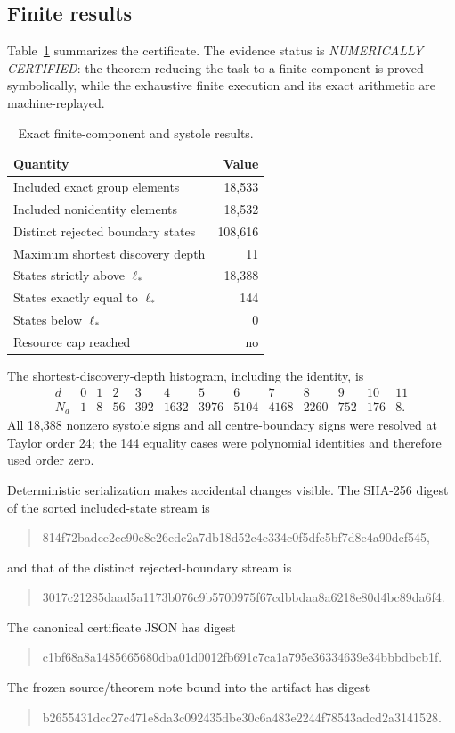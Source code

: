 \documentclass[11pt,a4paper]{article}
\theoremstyle{definition}
\newcommand{\length}{\ell}
\begin{document}
\subsection{Finite results}

Table~\ref{tab:results} summarizes the certificate.  The evidence status is
\emph{NUMERICALLY CERTIFIED}: the theorem reducing the task to a finite
component is proved symbolically, while the exhaustive finite execution and
its exact arithmetic are machine-replayed.

\begin{table}[htbp]
\centering
\caption{Exact finite-component and systole results.}
\label{tab:results}
\begin{tabular}{@{}lr@{}}
\toprule
Quantity & Value\\
\midrule
Included exact group elements & 18,533\\
Included nonidentity elements & 18,532\\
Distinct rejected boundary states & 108,616\\
Maximum shortest discovery depth & 11\\
States strictly above \(\length_*\) & 18,388\\
States exactly equal to \(\length_*\) & 144\\
States below \(\length_*\) & 0\\
Resource cap reached & no\\
\bottomrule
\end{tabular}
\end{table}

The shortest-discovery-depth histogram, including the identity, is
\[
\begin{array}{c|rrrrrrrrrrrr}
d&0&1&2&3&4&5&6&7&8&9&10&11\\\hline
N_d&1&8&56&392&1632&3976&5104&4168&2260&752&176&8.
\end{array}
\]
All 18,388 nonzero systole signs and all centre-boundary signs were resolved
at Taylor order 24; the 144 equality cases were polynomial identities and
therefore used order zero.

Deterministic serialization makes accidental changes visible.  The SHA-256
digest of the sorted included-state stream is
\begin{quote}\ttfamily\small
814f72badce2cc90e8e26edc2a7db18d52c4c334c0f5dfc5bf7d8e4a90dcf545,
\end{quote}
and that of the distinct rejected-boundary stream is
\begin{quote}\ttfamily\small
3017c21285daad5a1173b076c9b5700975f67cdbbdaa8a6218e80d4bc89da6f4.
\end{quote}
The canonical certificate JSON has digest
\begin{quote}\ttfamily\small
c1bf68a8a1485665680dba01d0012fb691c7ca1a795e36334639e34bbbdbcb1f.
\end{quote}
The frozen source/theorem note bound into the artifact has digest
\begin{quote}\ttfamily\small
b2655431dcc27c471e8da3c092435dbe30c6a483e2244f78543adcd2a3141528.
\end{quote}
\end{document}
